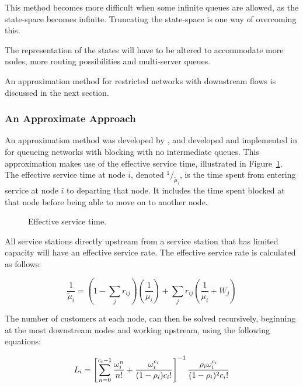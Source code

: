 \documentclass{article}
\begin{document}
This method becomes more difficult when some infinite queues are allowed, as the state-space becomes infinite.
Truncating the state-space is one way of overcoming this.

The representation of the states will have to be altered to accommodate more nodes, more routing possibilities and multi-server queues.



An approximation method for restricted networks with downstream flows is discussed in the next section.

\subsubsection{An Approximate Approach}

An approximation method was developed by \cite{takahashi80}, and developed and implemented in \cite{koizumietal05} for queueing networks with blocking with no intermediate queues.
This approximation makes use of the effective service time, illustrated in Figure~\ref{fig:effectiveservicetime}.
The effective service time at node $i$, denoted $^1 / _{\tilde{\mu}_i}$, is the time spent from entering service at node $i$ to departing that node.
It includes the time spent blocked at that node before being able to move on to another node.

\begin{figure}[H]
    
    \caption{Effective service time.}
    \label{fig:effectiveservicetime}
\end{figure}

All service stations directly upstream from a service station that has limited capacity will have an effective service rate.
The effective service rate is calculated as follows:

\begin{equation}
    \frac{1}{\tilde{\mu}_i} = \left( 1 - \sum_j r_{ij} \right) \left( \frac{1}{\mu_i} \right) + \sum_j r_{ij} \left( \frac{1}{\mu_i} + W_j \right)
\end{equation}

The number of customers at each node, can then be solved recursively, beginning at the most downstream nodes and working upstream, using the following equations:

\begin{equation} \label{eq:L}
    L_i = \left[ \sum_{n=0}^{c_i-1} {\omega_i^n \over n!} + {\omega_i^{c_i} \over (1 - \rho_i)c_i! } \right]^{-1} \frac{\rho_i \omega_i^{c_i}}{(1-\rho_i)^2 c_i!}
\end{equation}
\end{document}
